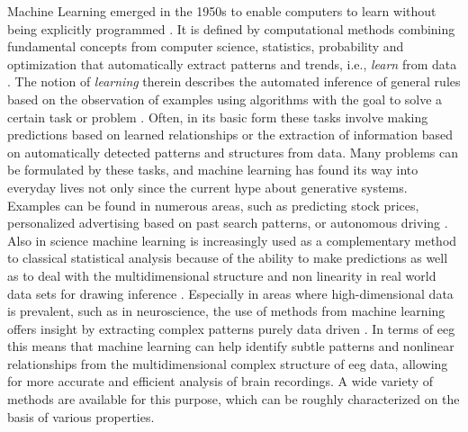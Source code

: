 Machine Learning emerged in the 1950s to enable computers to learn without being explicitly programmed \cite{Samual1959}. It is defined by computational methods combining fundamental concepts from computer science, statistics, probability and optimization that automatically extract patterns and trends, i.e., \textit{learn} from data \cite{Hastie2009}. The notion of \textit{learning} therein describes the automated inference of general rules based on the observation of examples using algorithms with the goal to solve a certain task or problem \cite{Von_luxburg2011}. Often, in its basic form these tasks involve making predictions based on learned relationships or the extraction of information based on automatically detected patterns and structures from data. Many problems can be formulated by these tasks, and machine learning has found its way into everyday lives not only since the current hype about generative systems. Examples can be found in numerous areas, such as predicting stock prices, personalized advertising based on past search patterns, or autonomous driving \cite{Rudin2014}.\\
Also in science machine learning is increasingly used as a complementary method to classical statistical analysis because of the ability to make predictions as well as to deal with the multidimensional structure and non linearity in real world data sets for drawing inference \cite{Bzdok2018}. Especially in areas where high-dimensional data is prevalent, such as in neuroscience, the use of methods from machine learning offers insight by extracting complex patterns purely data driven \cite{Brunton2019}. In terms of \gls{eeg} this means that machine learning can help identify subtle patterns and nonlinear relationships from the multidimensional complex structure of \gls{eeg} data, allowing for more accurate and efficient analysis of brain recordings. A wide variety of methods are available for this purpose, which can be roughly characterized on the basis of various properties. 

